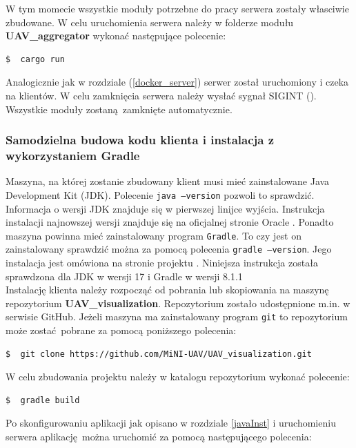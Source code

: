 \documentclass[15pt]{sprawozdanie}
\begin{document}
W tym momecie wszystkie moduły potrzebne do pracy serwera zostały własciwie zbudowane. W celu uruchomienia serwera należy w folderze modułu\\ \textbf{UAV\_aggregator} wykonać następujące polecenie:
\begin{lstlisting}[language=bash]
  $  cargo run
\end{lstlisting}

Analogicznie jak w rozdziale (\ref{docker_server}) serwer został uruchomiony i czeka na klientów. W celu zamknięcia serwera należy wysłać sygnał SIGINT (). Wszystkie moduły zostaną zamknięte automatycznie.

\subsubsection{Samodzielna budowa kodu klienta i instalacja z wykorzystaniem Gradle}
 
Maszyna, na której zostanie zbudowany klient musi mieć zainstalowane Java Development Kit (JDK). Polecenie \texttt{java --version} pozwoli to sprawdzić. Informacja o wersji JDK znajduje się w pierwszej linijce wyjścia. Instrukcja instalacji najnowszej wersji znajduje się na oficjalnej stronie Oracle \cite{javaDown}. Ponadto maszyna powinna mieć zainstalowany program \texttt{Gradle}. To czy jest on zainstalowany sprawdzić można za pomocą polecenia \texttt{gradle --version}. Jego instalacja jest omówiona na stronie projektu \cite{gradle}. Niniejsza instrukcja została sprawdzona dla JDK w wersji 17 i Gradle w wersji 8.1.1 \\


Instalację klienta należy rozpocząć od pobrania lub skopiowania na maszynę repozytorium \textbf{UAV\_visualization}. Repozytorium zostało udostępnione m.in. w serwisie GitHub. Jeżeli maszyna ma zainstalowany program \texttt{git} to repozytorium może zostać pobrane za pomocą poniższego polecenia:

\begin{lstlisting}[language=bash]
  $  git clone https://github.com/MiNI-UAV/UAV_visualization.git 
\end{lstlisting}

W celu zbudowania projektu należy w katalogu repozytorium wykonać polecenie:

\begin{lstlisting}[language=bash]
  $  gradle build
\end{lstlisting} 

Po skonfigurowaniu aplikacji jak opisano w rozdziale \ref{javaInst} i uruchomieniu serwera aplikację można uruchomić za pomocą następującego polecenia:
\end{document}
